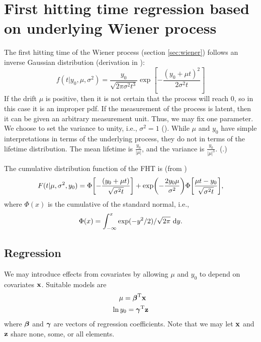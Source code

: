 \section{First hitting time regression based on underlying Wiener process}
The first hitting time of the Wiener process (section \ref{sec:wiener}) follows an inverse Gaussian distribution (derivation in \cite[23-29]{chhikara1988}):
\begin{equation}
\label{eq:fht-ig}
    f(t|y_0,\mu,\sigma^2)=\frac{y_0}{\sqrt{2\pi\sigma^2t^3}}\exp\left[-\frac{(y_0+\mu t)^2}{2\sigma^2t}\right]
\end{equation}
If the drift $\mu$ is positive, then it is not certain that the process will reach 0, so in this case it is an improper pdf. If the measurement of the process is latent, then it can be given an arbitrary measurement unit. Thus, we may fix one parameter. We choose to set the variance to unity, i.e., $\sigma^2=1$ (\cite{leewhitmore2006}). While $\mu$ and $y_0$ have simple interpretations in terms of the underlying process, they do not in terms of the lifetime distribution. The mean lifetime is $\frac{y_0}{|\mu|}$, and the variance is $\frac{y_0}{|\mu|^3}$. (\cite[62]{caroni2017}.)

The cumulative distribution function of the FHT is (from \cite[7]{threg})
\begin{equation}\label{eq:cumulative}
    F(t|\mu,\sigma^2,y_0)=\Phi\sqb*{-\frac{(y_0+\mu t)}{\sqrt{\sigma^2t}}}+\exp\p*{-\frac{2y_0\mu}{\sigma^2}}\Phi\sqb*{\frac{\mu t-y_0}{\sqrt{\sigma^2t}}},
\end{equation}
where $\Phi(x)$ is the cumulative of the standard normal, i.e.,
\begin{equation}
    \Phi(x)=\int_{-\infty}^x\exp(-y^2/2)/\sqrt{2\pi}\text{~d}y.
\end{equation}

\subsection{Regression}
We may introduce effects from covariates by allowing $\mu$ and $y_0$ to depend on covariates $\mathbf{x}$. Suitable models are
\begin{align}\label{eq:coeffs}
\begin{split}
    \mu=\bbeta^\T\x \\
    \ln y_0=\bgamma^\T\z
\end{split}
\end{align}
where $\boldsymbol{\beta}$ and $\boldsymbol{\gamma}$ are vectors of regression coefficients. Note that we may let $\mathbf{x}$ and $\mathbf{z}$ share none, some, or all elements.

